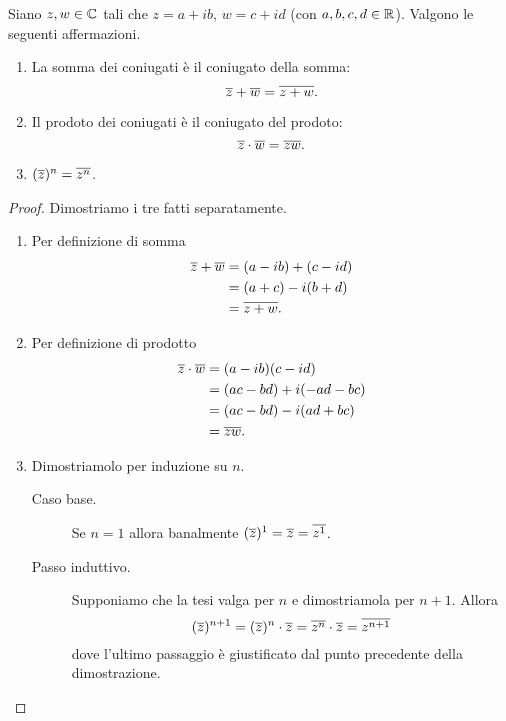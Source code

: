 \begin{proposition}\label{somma_prodotto_tra_coniugati}
    Siano $z, w \in \mathbb{C}$ tali che $z = a+ib$, $w = c + id$ (con $a, b, c, d \in \mathbb{R}$). Valgono le seguenti affermazioni.
     \begin{enumerate}[label={(\roman*)}]
        \item La somma dei coniugati è il coniugato della somma: \[
            \overline{z} + \overline{w} = \overline{z + w}.
        \]
        \item Il prodoto dei coniugati è il coniugato del prodoto: \[
            \overline{z}\cdot\overline{w} = \overline{zw}.
        \]
        \item $(\overline{z})^n = \overline{z^n}$.
    \end{enumerate}
\end{proposition}
\begin{proof}
    Dimostriamo i tre fatti separatamente.
    \begin{enumerate}[label={(\roman*)}]
        \item Per definizione di somma \begin{alignat*}
            {1}
            \overline{z} + \overline{w} &= (a-ib) + (c - id)\\
            &= (a+c) - i(b+d)\\
            &= \overline{z + w}.
        \end{alignat*}
        \item Per definizione di prodotto \begin{alignat*}
            {1}
            \overline{z}\cdot\overline{w} &= (a-ib)(c - id)\\
            &= (ac - bd) + i(-ad-bc)\\
            &= (ac - bd) - i(ad+bc)\\
            &= \overline{zw}.
        \end{alignat*}
        \item Dimostriamolo per induzione su $n$.
        \begin{description}
            \item[Caso base.] Se $n = 1$ allora banalmente $(\overline{z})^1 = \overline{z} = \overline{z^1}$.
            \item[Passo induttivo.] Supponiamo che la tesi valga per $n$ e dimostriamola per $n+1$. Allora \[
                (\overline{z})^{n+1} = (\overline{z})^{n} \cdot \overline{z} = \overline{z^n} \cdot \overline{z} = \overline{z^{n+1}}
            \] dove l'ultimo passaggio è giustificato dal punto precedente della dimostrazione. \qedhere
        \end{description}
    \end{enumerate}
\end{proof}

